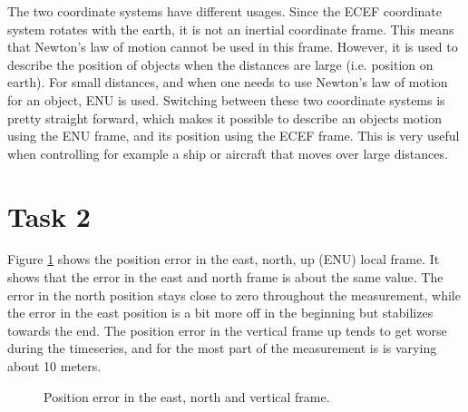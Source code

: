 \documentclass{article}
\begin{document}
The two coordinate systems have different usages. Since the ECEF coordinate system rotates with the earth, it is not an inertial coordinate frame. This means that Newton's law of motion cannot be used in this frame. However, it is used to describe the position of objects when the distances are large (i.e. position on earth). For small distances, and when one needs to use Newton's law of motion for an object, ENU is used. Switching between these two coordinate systems is pretty straight forward, which makes it possible to describe an objects motion using the ENU frame, and its position using the ECEF frame. This is very useful when controlling for example a ship or aircraft that moves over large distances.


\section*{Task 2}

Figure \ref{fig:pos_err} shows the position error in the east, north, up (ENU) local frame. It shows that the error in the east and north frame is about the same value. The error in the north position stays close to zero throughout the measurement, while the error in the east position is a bit more off in the beginning but stabilizes towards the end. The position error in the vertical frame up tends to get worse during the timeseries, and for the most part of the measurement is is varying about 10 meters.

\begin{figure}[!ht]
    \centering
    \caption{Position error in the east, north and vertical frame.}
    \label{fig:pos_err}
\end{figure}
\end{document}
